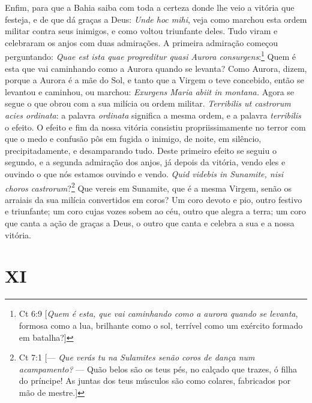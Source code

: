 Enfim, para que a Bahia saiba com toda a certeza donde lhe veio a
vitória que festeja, e de que dá graças a Deus: \emph{Unde hoc mihi},
veja como marchou esta ordem militar contra seus inimigos, e como voltou
triunfante deles. Tudo viram e celebraram os anjos com duas admirações.
A primeira admiração começou perguntando: \emph{Quae est ista quae
progreditur quasi Aurora consurgens}:\footnote{Ct 6:9 [\textit{Quem é esta, que vai caminhando como a aurora quando se levanta}, formosa como a lua, brilhante como o sol, terrível como um exército formado em batalha?]} Quem é esta
que vai caminhando como a Aurora quando se levanta? Como Aurora,
dizem, porque a Aurora é a mãe do Sol, e tanto que a Virgem o teve
concebido, então se levantou e caminhou, ou marchou: \emph{Exurgens
Maria abiit in montana.} Agora se segue o que obrou com a sua milícia
ou ordem militar. \emph{Terribilis ut castrorum acies ordinata}:
a palavra \emph{ordinata} significa a mesma ordem, e a palavra
\emph{terribilis} o efeito. O efeito e fim da nossa vitória consistiu
propriissimamente no terror com que o medo e confusão pôs em fugida o
inimigo, de noite, em silêncio, precipitadamente, e desamparando tudo.
Deste primeiro efeito se seguiu o segundo, e a segunda admiração dos
anjos, já depois da vitória, vendo eles e ouvindo o que nós estamos
ouvindo e vendo. \emph{Quid videbis in Sunamite, nisi choros castrorum}?\footnote{Ct 7:1 [--- \textit{Que verás tu na Sulamites senão coros de dança num acampamento?} --- Quão belos são os teus pés, no calçado que trazes, ó filha do príncipe! As juntas dos teus músculos são como colares, fabricados por mão de mestre.]}
Que vereis em Sunamite, que é a mesma Virgem, senão os
arraiais da sua milícia convertidos em coros? Um coro devoto e pio,
outro festivo e triunfante; um coro cujas vozes sobem ao céu, outro que
alegra a terra; um coro que canta a ação de graças a Deus, o outro que
canta e celebra a sua e a nossa vitória.

\section{XI}


